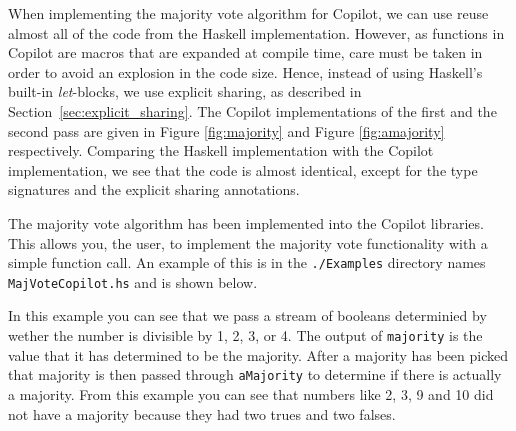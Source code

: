  


When implementing the majority vote algorithm for Copilot, we can use reuse
almost all of the code from the Haskell implementation. However, as functions
in Copilot are macros that are expanded at compile time, care must
be taken in order to avoid an explosion in the code size. Hence, instead of
using Haskell's built-in \emph{let}-blocks, we use explicit sharing, as
described in Section~\ref{sec:explicit_sharing}. The Copilot implementations
of the first and the second pass are given in Figure \ref{fig:majority} and
Figure \ref{fig:amajority} respectively. Comparing the Haskell implementation
with the Copilot implementation, we see that the code is almost identical,
except for the type signatures and the explicit sharing annotations.


The majority vote algorithm has been implemented into the Copilot libraries. This allows you, the user, to implement the majority vote functionality with a simple function call. An example of this is in the {\tt ./Examples} directory names {\tt MajVoteCopilot.hs} and is shown below.




In this example you can see that we pass a stream of booleans determinied by wether the number is divisible by 1, 2, 3, or 4. The output of {\tt majority} is the value that it has determined to be the majority. After a majority has been picked that majority is then passed through {\tt aMajority} to determine if there is actually a majority. From this example you can see that numbers like 2, 3, 9 and 10 did not have a majority because they had two trues and two falses.  
